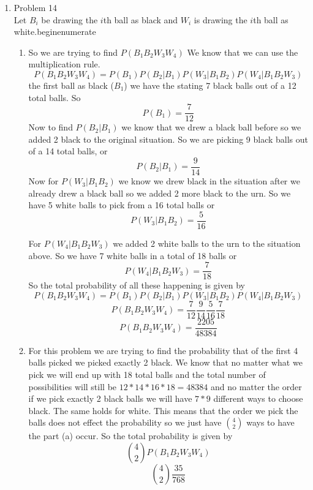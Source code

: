 \documentclass[11pt]{article}
\newcommand{\Let}{\textnormal{Let }}
\begin{document}
\begin{enumerate}
\item Problem 14\\
\Let $B_i$ be drawing the $i$th ball as black and $W_i$ is drawing the $i$th ball as white.begin{enumerate}
\begin{enumerate}
\item
So we are trying to find $P(B_1B_2W_3W_4)$ We know that we can use the multiplication rule.
$$P(B_1B_2W_3W_4)=P(B_1)P(B_2|B_1)P(W_3|B_1B_2)P(W_4|B_1B_2W_3)$$
the first ball as black ($B_1$) we have the stating 7 black balls out of a 12 total balls. So
$$P(B_1) = \frac{7}{12}$$
Now to find $P(B_2|B_1)$ we know that we drew a black ball before so we added 2 black to the original situation. So we are picking 9 black balls out of a 14 total balls, or
$$P(B_2|B_1) = \frac{9}{14}$$
Now for $P(W_3|B_1B_2)$ we know we drew black in the situation after we already drew a black ball so we added 2 more black to the urn. So we have 5 white balls to pick from a 16 total balls or
$$P(W_3|B_1B_2) =\frac{5}{16}$$

For $P(W_4|B_1B_2W_3)$ we added 2 white balls to the urn to the situation above. So we have 7 white balls in a total of 18 balls or
$$P(W_4|B_1B_2W_3) =\frac{7}{18}$$
So the total probability of all these happening is given by 
$$P(B_1B_2W_3W_4)=P(B_1)P(B_2|B_1)P(W_3|B_1B_2)P(W_4|B_1B_2W_3)$$
$$P(B_1B_2W_3W_4)=\frac{7}{12}\frac{9}{14}\frac{5}{16}\frac{7}{18}$$
$$P(B_1B_2W_3W_4)=\frac{2205}{48384}$$
\begin{center}
\end{center}
\item
For this problem we are trying to find the probability that of the first 4 balls picked we picked exactly 2 black. We know that no matter what we pick we will end up with 18 total balls and the total number of possibilities will still be $12*14*16*18=48384$ and no matter the order if we pick exactly 2 black balls we will have $7*9$ different ways to choose black. The same holds for white. This means that the order we pick the balls does not effect the probability so we just have $4\choose2$ ways to have the part (a) occur. So the total probability is given by 
$${4\choose2}P(B_1B_2W_3W_4)$$
$${4\choose2}\frac{35}{768}$$
\begin{center}
\end{center}
\end{enumerate}


\end{enumerate}
\end{document}
